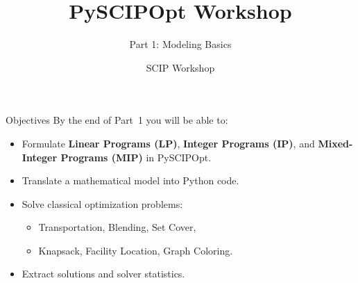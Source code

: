 \documentclass[aspectratio=169,10pt]{beamer}
\title{PySCIPOpt Workshop}
\subtitle{Part 1: Modeling Basics}
\author{SCIP Workshop}
\date{}
\begin{document}
\begin{frame}
\titlepage
\end{frame}

\begin{frame}{Objectives}
By the end of Part~1 you will be able to:
\begin{itemize}
  \item Formulate \textbf{Linear Programs (LP)}, \textbf{Integer Programs (IP)},
        and \textbf{Mixed-Integer Programs (MIP)} in PySCIPOpt.
  \item Translate a mathematical model into Python code.
  \item Solve classical optimization problems:
    \begin{itemize}
      \item Transportation, Blending, Set Cover,
      \item Knapsack, Facility Location, Graph Coloring.
    \end{itemize}
  \item Extract solutions and solver statistics.
\end{itemize}
\end{frame}
\end{document}
